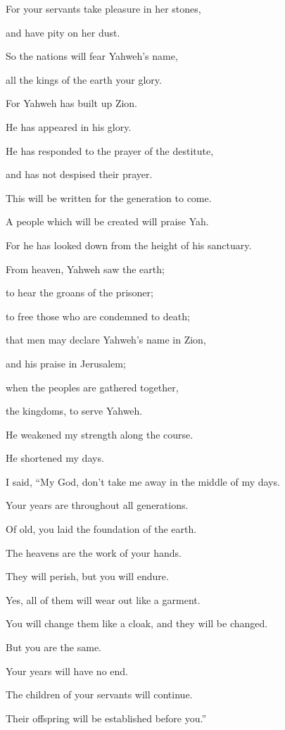 {\par }{\Q {}For your servants take pleasure in her stones,
\par }{\QB and have pity on her dust.
\par }{\Q {}So the nations will fear Yahweh’s name,
\par }{\QB all the kings of the earth your glory.
\par }{\Q {}For Yahweh has built up Zion.
\par }{\QB He has appeared in his glory.
\par }{\Q {}He has responded to the prayer of the destitute,
\par }{\QB and has not despised their prayer.
\par }{\Q {}This will be written for the generation to come.
\par }{\QB A people which will be created will praise Yah.
\par }{\Q {}For he has looked down from the height of his sanctuary.
\par }{\QB From heaven, Yahweh saw the earth;
\par }{\Q {}to hear the groans of the prisoner;
\par }{\QB to free those who are condemned to death;
\par }{\Q {}that men may declare Yahweh’s name in Zion,
\par }{\QB and his praise in Jerusalem;
\par }{\Q {}when the peoples are gathered together,
\par }{\QB the kingdoms, to serve Yahweh.
\par }{\BB \par }{\Q {}He weakened my strength along the course.
\par }{\QB He shortened my days.
\par }{\Q {}I said, “My God, don’t take me away in the middle of my days.
\par }{\QB Your years are throughout all generations.
\par }{\Q {}Of old, you laid the foundation of the earth.
\par }{\QB The heavens are the work of your hands.
\par }{\Q {}They will perish, but you will endure.
\par }{\QB Yes, all of them will wear out like a garment.
\par }{\QB You will change them like a cloak, and they will be changed.
\par }{\Q {}But you are the same.
\par }{\QB Your years will have no end.
\par }{\Q {}The children of your servants will continue.
\par }{\QB Their offspring will be established before you.”

}
